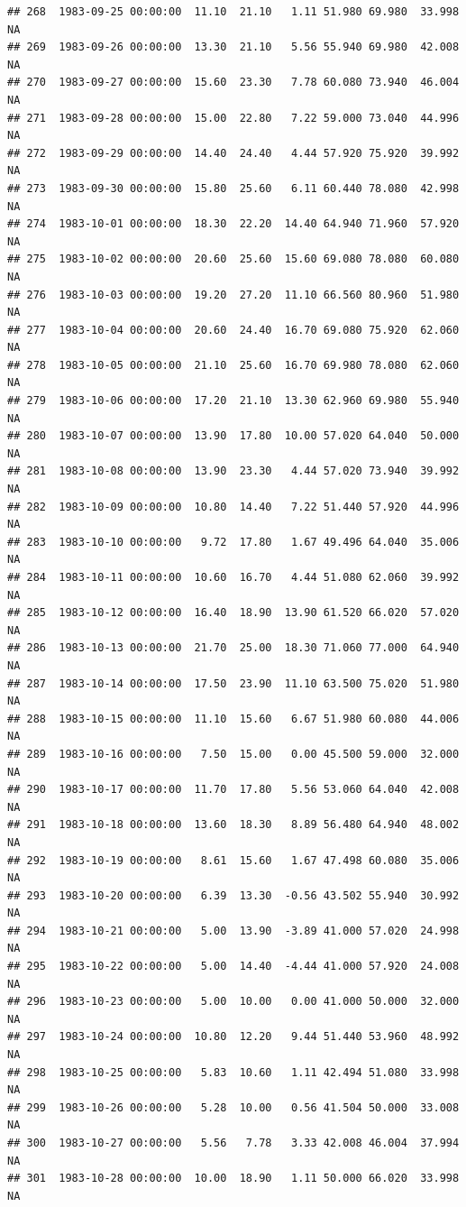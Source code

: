 \documentclass{article}\usepackage{graphicx, color}
\makeatletter
\newenvironment{kframe}{%
 \def\at@end@of@kframe{}%
 \ifinner\ifhmode%
  \def\at@end@of@kframe{\end{minipage}}%
  \begin{minipage}{\columnwidth}%
 \fi\fi%
 \def\FrameCommand##1{\hskip\@totalleftmargin \hskip-\fboxsep
 \colorbox{shadecolor}{##1}\hskip-\fboxsep
     \hskip-\linewidth \hskip-\@totalleftmargin \hskip\columnwidth}%
 \MakeFramed {\advance\hsize-\width
   \@totalleftmargin\z@ \linewidth\hsize
   \@setminipage}}%
 {\par\unskip\endMakeFramed%
 \at@end@of@kframe}
\newenvironment{knitrout}{}{} %
\makeatother
\begin{document}
\begin{knitrout}
\begin{kframe}
\begin{verbatim}
## 268  1983-09-25 00:00:00  11.10  21.10   1.11 51.980 69.980  33.998     NA
## 269  1983-09-26 00:00:00  13.30  21.10   5.56 55.940 69.980  42.008     NA
## 270  1983-09-27 00:00:00  15.60  23.30   7.78 60.080 73.940  46.004     NA
## 271  1983-09-28 00:00:00  15.00  22.80   7.22 59.000 73.040  44.996     NA
## 272  1983-09-29 00:00:00  14.40  24.40   4.44 57.920 75.920  39.992     NA
## 273  1983-09-30 00:00:00  15.80  25.60   6.11 60.440 78.080  42.998     NA
## 274  1983-10-01 00:00:00  18.30  22.20  14.40 64.940 71.960  57.920     NA
## 275  1983-10-02 00:00:00  20.60  25.60  15.60 69.080 78.080  60.080     NA
## 276  1983-10-03 00:00:00  19.20  27.20  11.10 66.560 80.960  51.980     NA
## 277  1983-10-04 00:00:00  20.60  24.40  16.70 69.080 75.920  62.060     NA
## 278  1983-10-05 00:00:00  21.10  25.60  16.70 69.980 78.080  62.060     NA
## 279  1983-10-06 00:00:00  17.20  21.10  13.30 62.960 69.980  55.940     NA
## 280  1983-10-07 00:00:00  13.90  17.80  10.00 57.020 64.040  50.000     NA
## 281  1983-10-08 00:00:00  13.90  23.30   4.44 57.020 73.940  39.992     NA
## 282  1983-10-09 00:00:00  10.80  14.40   7.22 51.440 57.920  44.996     NA
## 283  1983-10-10 00:00:00   9.72  17.80   1.67 49.496 64.040  35.006     NA
## 284  1983-10-11 00:00:00  10.60  16.70   4.44 51.080 62.060  39.992     NA
## 285  1983-10-12 00:00:00  16.40  18.90  13.90 61.520 66.020  57.020     NA
## 286  1983-10-13 00:00:00  21.70  25.00  18.30 71.060 77.000  64.940     NA
## 287  1983-10-14 00:00:00  17.50  23.90  11.10 63.500 75.020  51.980     NA
## 288  1983-10-15 00:00:00  11.10  15.60   6.67 51.980 60.080  44.006     NA
## 289  1983-10-16 00:00:00   7.50  15.00   0.00 45.500 59.000  32.000     NA
## 290  1983-10-17 00:00:00  11.70  17.80   5.56 53.060 64.040  42.008     NA
## 291  1983-10-18 00:00:00  13.60  18.30   8.89 56.480 64.940  48.002     NA
## 292  1983-10-19 00:00:00   8.61  15.60   1.67 47.498 60.080  35.006     NA
## 293  1983-10-20 00:00:00   6.39  13.30  -0.56 43.502 55.940  30.992     NA
## 294  1983-10-21 00:00:00   5.00  13.90  -3.89 41.000 57.020  24.998     NA
## 295  1983-10-22 00:00:00   5.00  14.40  -4.44 41.000 57.920  24.008     NA
## 296  1983-10-23 00:00:00   5.00  10.00   0.00 41.000 50.000  32.000     NA
## 297  1983-10-24 00:00:00  10.80  12.20   9.44 51.440 53.960  48.992     NA
## 298  1983-10-25 00:00:00   5.83  10.60   1.11 42.494 51.080  33.998     NA
## 299  1983-10-26 00:00:00   5.28  10.00   0.56 41.504 50.000  33.008     NA
## 300  1983-10-27 00:00:00   5.56   7.78   3.33 42.008 46.004  37.994     NA
## 301  1983-10-28 00:00:00  10.00  18.90   1.11 50.000 66.020  33.998     NA

\end{verbatim}
\end{kframe}
\end{knitrout}
\end{document}

